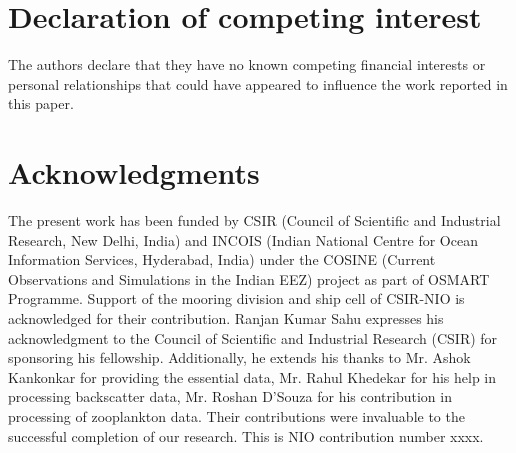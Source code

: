 \documentclass[authoryear,review,12pt]{elsarticle}
\begin{document}
	\section{Declaration of competing interest}
	The authors declare that they have no known competing financial interests or personal
	relationships that could have appeared to influence the work reported in this paper.
	
	\section{Acknowledgments} 
	
	The present work has been funded by CSIR (Council of Scientific and Industrial Research, New Delhi, India) and INCOIS (Indian National Centre for Ocean Information Services, Hyderabad, India)  under the COSINE (Current Observations and Simulations in the Indian EEZ) project as part of OSMART Programme. Support of the mooring division and ship cell of CSIR-NIO is acknowledged for their contribution. Ranjan Kumar Sahu expresses his acknowledgment to the Council of Scientific and Industrial Research (CSIR) for sponsoring his fellowship. Additionally, he extends his thanks to Mr. Ashok Kankonkar for providing the essential data, Mr. Rahul Khedekar for his help in processing backscatter data, Mr. Roshan D'Souza for his contribution  in processing of zooplankton data. Their contributions were invaluable to the successful completion of our research. This is NIO contribution number xxxx.


\linespread{1}	
{\footnotesize 	{} 
}	

\newpage
{} 
\end{document}

